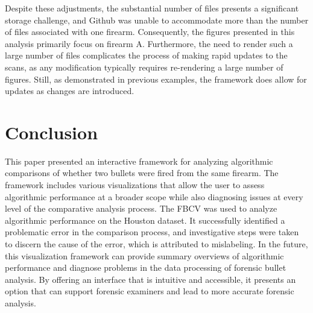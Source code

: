 \documentclass[
  12pt]{article}
\begin{document}
Despite these adjustments, the substantial number of files presents a
significant storage challenge, and Github was unable to accommodate more
than the number of files associated with one firearm. Consequently, the
figures presented in this analysis primarily focus on firearm A.
Furthermore, the need to render such a large number of files complicates
the process of making rapid updates to the scans, as any modification
typically requires re-rendering a large number of figures. Still, as
demonstrated in previous examples, the framework does allow for updates
as changes are introduced.

\section{Conclusion}\label{conclusion}

This paper presented an interactive framework for analyzing algorithmic
comparisons of whether two bullets were fired from the same firearm. The
framework includes various visualizations that allow the user to assess
algorithmic performance at a broader scope while also diagnosing issues
at every level of the comparative analysis process. The FBCV was used to
analyze algorithmic performance on the Houston dataset. It successfully
identified a problematic error in the comparison process, and
investigative steps were taken to discern the cause of the error, which
is attributed to mislabeling. In the future, this visualization
framework can provide summary overviews of algorithmic performance and
diagnose problems in the data processing of forensic bullet analysis. By
offering an interface that is intuitive and accessible, it presents an
option that can support forensic examiners and lead to more accurate
forensic analysis.


  
\end{document}
